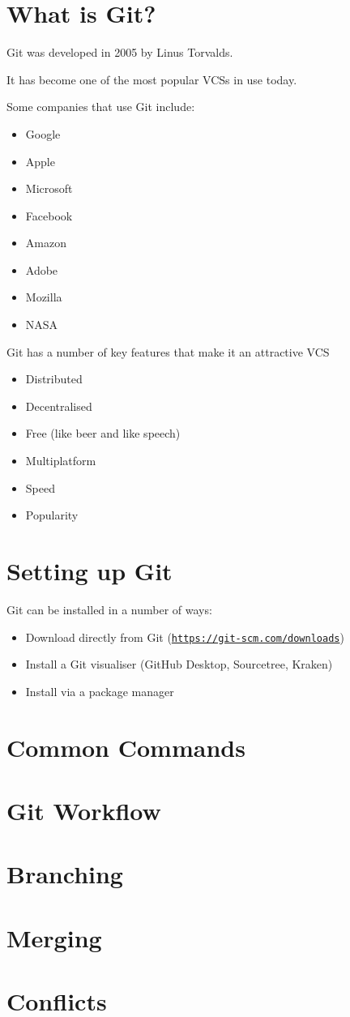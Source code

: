\documentclass{beamer}
\begin{document}
\section{What is Git?}
\begin{frame}[allowframebreaks]{\secname}
    Git was developed in 2005 by Linus Torvalds.
    
    It has become one of the most popular VCSs in use today.

    Some companies that use Git include:
    \begin{itemize}
    \item Google
    \item Apple
    \item Microsoft
    \item Facebook
    \item Amazon
    \item Adobe
    \item Mozilla
    \item NASA
    \end{itemize}

\framebreak

    Git has a number of key features that make it an attractive VCS
    \begin{itemize}
    \item Distributed
    \item Decentralised
    \item Free (like beer and like speech)
    \item Multiplatform
    \item Speed
    \item Popularity
    \end{itemize}

\end{frame}


\section{Setting up Git}
\begin{frame}{\secname}
    Git can be installed in a number of ways:
    \begin{itemize}
    \item Download directly from Git ({\tt \url{https://git-scm.com/downloads}}) 
    \item Install a Git visualiser (GitHub Desktop, Sourcetree, Kraken)
    \item Install via a package manager 
    \end{itemize}
\end{frame}

\section{Common Commands}
\section{Git Workflow}
\section{Branching}
\section{Merging}
\section{Conflicts}
\end{document}
